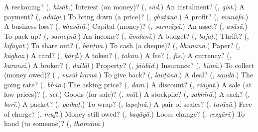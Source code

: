 \begin{tcolorbox}[breakable,colback=teal!4,colframe=teal!35!black,title={Before you move on}]
A reckoning? (\textbf{}, \emph{hisāb}.) Interest (on money)? (\textbf{}, \emph{sūd}.) An instalment? (\textbf{}, \emph{qist}.) A payment? (\textbf{}, \emph{adāigī}.) To bring down (a price)? (\textbf{}, \emph{ghaṭānā}.) A profit? (\textbf{}, \emph{munāfā}.) A business loss? (\textbf{}, \emph{khasārā}.) Capital (money)? (\textbf{}, \emph{sarmāyā}.) An asset? (\textbf{}, \emph{asāsā}.) To pack up? (\textbf{}, \emph{sameṭnā}.) An income? (\textbf{}, \emph{āmdanī}.) A budget? (\textbf{}, \emph{bajaṭ}.) Thrift? (\textbf{}, \emph{kifāyat}.) To share out? (\textbf{}, \emph{bāṅṭnā}.) To cash (a cheque)? (\textbf{}, \emph{bhunānā}.) Paper? (\textbf{}, \emph{kāghaz}.) A card? (\textbf{}, \emph{kārḍ}.) A token? (\textbf{}, \emph{ṭokan}.) A fee? (\textbf{}, \emph{fīs}.) A currency? (\textbf{}, \emph{karansī}.) A broker? (\textbf{}, \emph{dallāl}.) Property? (\textbf{}, \emph{jāidād}.) Insurance? (\textbf{}, \emph{bīmā}.) To collect (money owed)? (\textbf{ }, \emph{vusūl karnā}.) To give back? (\textbf{}, \emph{lauṭānā}.) A deal? (\textbf{}, \emph{saudā}.) The going rate? (\textbf{}, \emph{bhāo}.) The asking price? (\textbf{}, \emph{dām}.) A discount? (\textbf{}, \emph{riāyat}.) A sale (at low prices)? (\textbf{}, \emph{sel}.) Goods (for sale)? (\textbf{}, \emph{māl}.) A stockpile? (\textbf{}, \emph{zakhīrā}.) A sack? (\textbf{}, \emph{borī}.) A packet? (\textbf{}, \emph{paikaṭ}.) To wrap? (\textbf{}, \emph{lapeṭnā}.) A pair of scales? (\textbf{}, \emph{tarāzū}.) Free of charge? (\textbf{}, \emph{muft}.) Money still owed? (\textbf{}, \emph{baqāyā}.) Loose change? (\textbf{}, \emph{rezgārī}.) To hand (to someone)? (\textbf{}, \emph{thamānā}.)
\end{tcolorbox}
